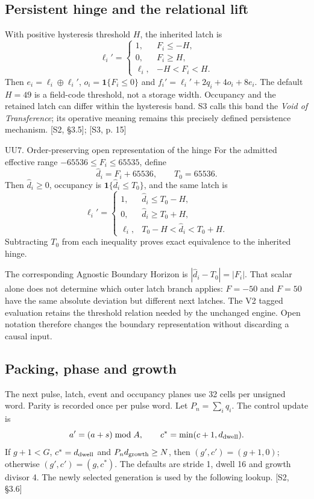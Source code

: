 \documentclass[11pt,a4paper]{article}
\numberwithin{equation}{section}
\newcommand{\src}[2]{{\sffamily\small\color{slate}[#1, #2]}}
\newcommand{\ind}{\mathbf 1}
\newcommand{\xor}{\mathbin{\oplus}}
\begin{document}
\subsection{Persistent hinge and the relational lift}
With positive hysteresis threshold $H$, the inherited latch is
\begin{equation}
\ell_i'=\begin{cases}
1,&F_i\le-H,\\
0,&F_i\ge H,\\
\ell_i,&-H<F_i<H.
\end{cases}
\end{equation}
Then $e_i=\ell_i\xor\ell_i'$, $o_i=\ind\{F_i\le0\}$ and
$f_i'=\ell_i'+2q_i+4o_i+8e_i$. The default $H=49$ is a field-code threshold, not a storage width. Occupancy and the retained latch can differ within the hysteresis band. S3 calls this band the \emph{Void of Transference}; its operative meaning remains this precisely defined persistence mechanism. \src{S2}{\S3.5}; \src{S3}{p. 15}

\begin{formal}{UU7. Order-preserving open representation of the hinge}
For the admitted effective range $-65536\le F_i\le65535$, define
\[
\widehat d_i=F_i+65536,\qquad T_0=65536.
\]
Then $\widehat d_i\ge0$, occupancy is $\ind\{\widehat d_i\le T_0\}$, and the same latch is
\[
\ell_i'=\begin{cases}
1,&\widehat d_i\le T_0-H,\\
0,&\widehat d_i\ge T_0+H,\\
\ell_i,&T_0-H<\widehat d_i<T_0+H.
\end{cases}
\]
Subtracting $T_0$ from each inequality proves exact equivalence to the inherited hinge.
\end{formal}
The corresponding Agnostic Boundary Horizon is $|\widehat d_i-T_0|=|F_i|$. That scalar alone does not determine which outer latch branch applies: $F=-50$ and $F=50$ have the same absolute deviation but different next latches. The V2 tagged evaluation retains the threshold relation needed by the unchanged engine. Open notation therefore changes the boundary representation without discarding a causal input.

\subsection{Packing, phase and growth}
The next pulse, latch, event and occupancy planes use 32 cells per unsigned word. Parity is recorded once per pulse word. Let $P_n=\sum_iq_i$. The control update is
\begin{equation}
a'=(a+s)\bmod A,\qquad c^*=\min(c+1,d_{\rm dwell}).
\end{equation}
If $g+1<G$, $c^*=d_{\rm dwell}$ and $P_nd_{\rm growth}\ge N$, then $(g',c')=(g+1,0)$; otherwise $(g',c')=(g,c^*)$. The defaults are stride 1, dwell 16 and growth divisor 4. The newly selected generation is used by the following lookup. \src{S2}{\S3.6}
\end{document}
